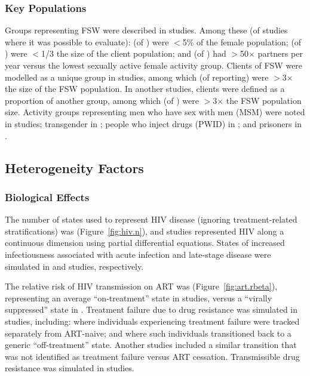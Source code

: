 \subsubsection{Key Populations}
\label{sss:res:kp}
Groups representing FSW were described in  studies.
Among these (of studies where it was possible to evaluate):
 (of ) were {$<$5\%} of the female population;
 (of ) were {$<$1/3} the size of the client population; and
 (of ) had {$>$50$\times$} partners per year versus
the lowest sexually active female activity group.
Clients of FSW were modelled as a unique group in  studies,
among which  (of  reporting)
were {$>$3$\times$} the size of the FSW population.
In another  studies, clients were defined as a proportion of another group,
among which  (of )
were {$>$3$\times$} the FSW population size.
Activity groups representing
men who have sex with men (MSM) were noted in  studies;
transgender in ;
people who inject drugs (PWID) in ; and
prisoners in .
\subsection{Heterogeneity Factors}
\label{ss:res:factors}
\subsubsection{Biological Effects}
\label{sss:res:bio}
The \xdmdef number of states used to represent HIV disease
(ignoring treatment-related stratifications) was  (Figure~\ref{fig:hiv.n}),
and  studies represented HIV along a continuous dimension
using partial differential equations.
States of increased infectiousness associated with acute infection and late-stage disease
were simulated in  and  studies, respectively.
\par
The relative risk of HIV transmission on ART was 
(Figure~\ref{fig:art.rbeta}),
representing an average ``on-treatment'' state in  studies,
versus a ``virally suppressed'' state in .
Treatment failure due to drug resistance was simulated in  studies, including:
 where individuals experiencing treatment failure
were tracked separately from ART-naive; and
 where such individuals
transitioned back to a generic ``off-treatment'' state.
Another  studies included a similar transition
that was not identified as treatment failure versus ART cessation.
Transmissible drug resistance was simulated in  studies.

